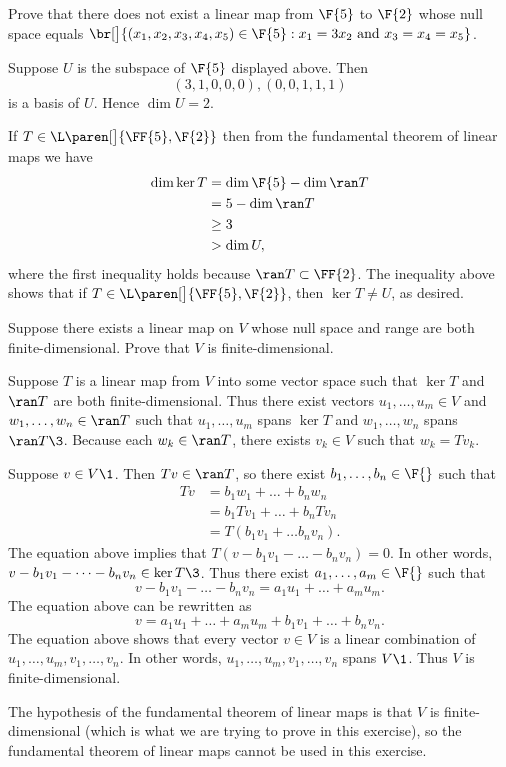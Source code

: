 \exercise
Prove that there does not exist a linear map from $\F{5}$ to $\F{2}$ whose
null space equals
$
\br[\big]{(x_1, x_2, x_3, x_4, x_5) \in \F{5}: x_1 = 3 x_2 \mbox{\ and\ } x_3 = x_4 = x_5}$.

\begin{Solution}
Suppose $U$ is the subspace of $\F{5}$ displayed above.  Then
\[
(3,1,0,0,0), (0,0,1,1,1)
\]
is a basis of $U$. Hence $\dim U = 2$.

If $T \in \L\paren[\big]{\FF{5}, \F{2}}$ then from the fundamental theorem of linear maps we have
\begin{align*}
\dim \ker T &= \dim \F{5} - \dim \ran T \\
&= 5 - \dim \ran T \\
&\ge 3 \\
&> \dim U,
\end{align*}
where the first inequality holds because $\ran T \subset \FF{2}$.  The inequality
above shows that if $T \in \L\paren[\big]{\FF{5}, \F{2}}$, then $\ker T \ne U$, as desired.
\end{Solution}

\exercise
Suppose there exists a linear map on $V$ whose null space and range are both
finite-dimensional. Prove that $V$ is finite-dimensional.

\begin{Solution}
Suppose $T$ is a linear map from $V$ into some vector space such that
$\ker T$ and $\ran T$ are both finite-dimensional.  Thus there exist vectors
$u_1, \dots, u_m \in V$ and $w_1, \dots, w_n \in \ran T$ such that
$u_1, \dots, u_m$ spans $\ker T$ and $w_1, \dots, w_n$ spans $\ran T\3$.
Because each $w_k \in \ran T$, there exists $v_k \in V$ such that $w_k = Tv_k$.

Suppose $v \in V\1$.  Then $Tv \in \ran T$, so there exist
$b_1, \dots, b_n \in \F{}$ such that
\begin{align*}
Tv &= b_1 w_1 + \dots + b_n w_n \\
&= b_1 Tv_1 + \dots + b_n Tv_n \\
&= T(b_1 v_1 + \dots b_n v_n).
\end{align*}
The equation above implies that $T(v - b_1 v_1 - \dots - b_n v_n) = 0$.  In other
words, $v - b_1 v_1 - \dots - b_n v_n \in \ker T\3$.  Thus there exist
$a_1, \dots, a_m \in \F{}$ such that
\[
v - b_1 v_1 - \dots - b_n v_n  = a_1 u_1 + \dots + a_m u_m.
\]
The equation above can be rewritten as
\[
v = a_1 u_1 + \dots + a_m u_m + b_1 v_1 + \dots + b_n v_n.
\]
The equation above shows that every vector $v \in V$ is a linear
combination of $u_1, \dots, u_m, v_1, \dots, v_n$.  In other words,
$u_1, \dots, u_m, v_1, \dots, v_n$ spans $V\1$.  Thus $V$ is finite-dimensional.

\Comment
The hypothesis of the fundamental theorem of linear maps is that $V$ is finite-dimensional (which is what we are
trying to prove in this exercise), so the fundamental theorem of linear maps cannot be used in this exercise.
\end{Solution}

